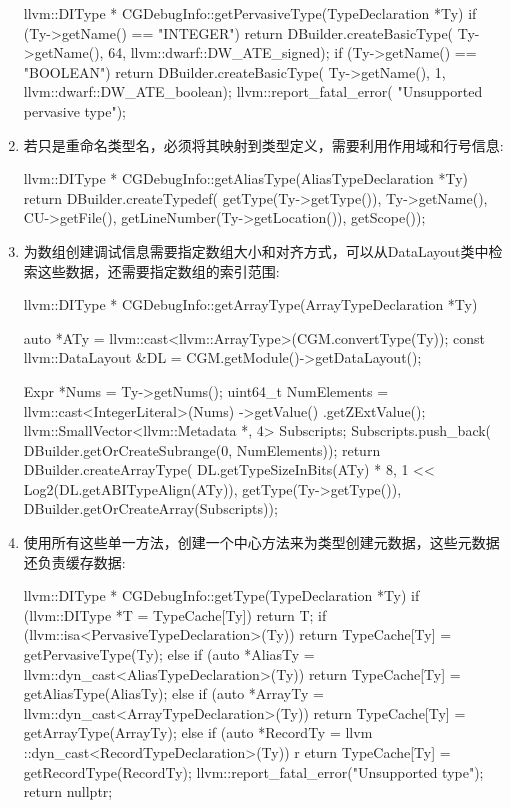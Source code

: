 \begin{enumerate}
\begin{cpp}
llvm::DIType *
CGDebugInfo::getPervasiveType(TypeDeclaration *Ty) {
    if (Ty->getName() == "INTEGER") {
        return DBuilder.createBasicType(
            Ty->getName(), 64, llvm::dwarf::DW_ATE_signed);
    }
    if (Ty->getName() == "BOOLEAN") {
        return DBuilder.createBasicType(
            Ty->getName(), 1, llvm::dwarf::DW_ATE_boolean);
    }
    llvm::report_fatal_error(
        "Unsupported pervasive type");
}
\end{cpp}

\item
若只是重命名类型名，必须将其映射到类型定义，需要利用作用域和行号信息:

\begin{cpp}
llvm::DIType *
CGDebugInfo::getAliasType(AliasTypeDeclaration *Ty) {
    return DBuilder.createTypedef(
        getType(Ty->getType()), Ty->getName(),
        CU->getFile(), getLineNumber(Ty->getLocation()),
        getScope());
}
\end{cpp}

\item
为数组创建调试信息需要指定数组大小和对齐方式，可以从DataLayout类中检索这些数据，还需要指定数组的索引范围:

\begin{cpp}
llvm::DIType *
CGDebugInfo::getArrayType(ArrayTypeDeclaration *Ty) {
    auto *ATy =
        llvm::cast<llvm::ArrayType>(CGM.convertType(Ty));
    const llvm::DataLayout &DL =
        CGM.getModule()->getDataLayout();

    Expr *Nums = Ty->getNums();
    uint64_t NumElements =
        llvm::cast<IntegerLiteral>(Nums)
            ->getValue()
            .getZExtValue();
    llvm::SmallVector<llvm::Metadata *, 4> Subscripts;
    Subscripts.push_back(
        DBuilder.getOrCreateSubrange(0, NumElements));
    return DBuilder.createArrayType(
        DL.getTypeSizeInBits(ATy) * 8,
        1 << Log2(DL.getABITypeAlign(ATy)),
        getType(Ty->getType()),
        DBuilder.getOrCreateArray(Subscripts));
}
\end{cpp}

\item
使用所有这些单一方法，创建一个中心方法来为类型创建元数据，这些元数据还负责缓存数据:

\begin{cpp}
llvm::DIType *
CGDebugInfo::getType(TypeDeclaration *Ty) {
    if (llvm::DIType *T = TypeCache[Ty])
        return T;
    if (llvm::isa<PervasiveTypeDeclaration>(Ty))
        return TypeCache[Ty] = getPervasiveType(Ty);
    else if (auto *AliasTy =
        llvm::dyn_cast<AliasTypeDeclaration>(Ty))
            return TypeCache[Ty] = getAliasType(AliasTy);
    else if (auto *ArrayTy =
        llvm::dyn_cast<ArrayTypeDeclaration>(Ty))
            return TypeCache[Ty] = getArrayType(ArrayTy);
    else if (auto *RecordTy =
        llvm ::dyn_cast<RecordTypeDeclaration>(Ty))
        r   eturn TypeCache[Ty] = getRecordType(RecordTy);
    llvm::report_fatal_error("Unsupported type");
    return nullptr;
}
\end{cpp}


\end{enumerate}
